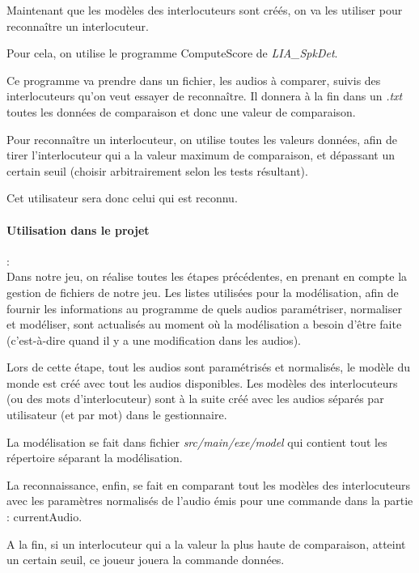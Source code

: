 Maintenant que les modèles des interlocuteurs sont créés, on va les utiliser pour reconnaître un interlocuteur.

Pour cela, on utilise le programme ComputeScore de \textit{LIA\_SpkDet}.

Ce programme va prendre dans un fichier, les audios à comparer, suivis des interlocuteurs qu'on veut essayer de reconnaître. Il donnera à la fin dans un \textit{.txt} toutes les données de comparaison et donc une valeur de comparaison.

Pour reconnaître un interlocuteur, on utilise toutes les valeurs données, afin de tirer l'interlocuteur qui a la valeur maximum de comparaison, et dépassant
un certain seuil (choisir arbitrairement selon les tests résultant).

Cet utilisateur sera donc celui qui est reconnu.


\paragraph*{Utilisation dans le projet} : \\
Dans notre jeu, on réalise toutes les étapes précédentes, en prenant en compte la gestion de fichiers de notre jeu. Les listes utilisées pour la modélisation,
afin de fournir les informations au programme de quels audios paramétriser, normaliser et modéliser, sont actualisés au moment où la modélisation a besoin
d'être faite (c'est-à-dire quand il y a une modification dans les audios).

Lors de cette étape, tout les audios sont paramétrisés et normalisés, le modèle du monde est créé avec tout les audios disponibles.
Les modèles des interlocuteurs (ou des mots d'interlocuteur) sont à la suite créé avec les audios séparés par utilisateur (et par mot) dans le gestionnaire.

La modélisation se fait dans fichier \textit{ src/main/exe/model} qui contient tout les répertoire séparant la modélisation.

La reconnaissance, enfin, se fait en comparant tout les modèles des interlocuteurs avec les paramètres normalisés de l'audio émis pour une commande dans la partie : currentAudio.

A la fin, si un interlocuteur qui a la valeur la plus haute de comparaison, atteint un certain seuil, ce joueur jouera la commande données.
